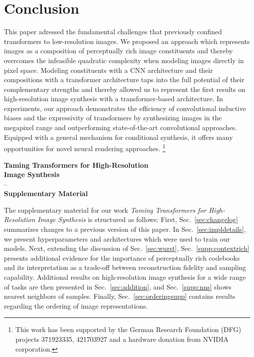 \documentclass[final]{cvpr}
\newcommand{\blfootnote}[1]{%
  \begingroup
  \renewcommand\thefootnote{}\footnote{#1}%
  \addtocounter{footnote}{-1}%
  \endgroup
  }
\begin{document}
%
\section{Conclusion}
%
%
\noindent This paper adressed the fundamental challenges that previously confined transformers to
low-resolution images. We
proposed an approach which represents images as a composition of perceptually
rich image constituents and thereby overcomes the infeasible quadratic
complexity when modeling images directly in pixel space. Modeling constituents
with a CNN architecture and their compositions with a transformer architecture
taps into the full potential of their complementary strengths and thereby
allowed us to represent the first results on high-resolution image synthesis
with a transformer-based architecture. In experiments, our approach
demonstrates the efficiency of convolutional inductive biases and the
expressivity of transformers by synthesizing images in the megapixel range and
outperforming state-of-the-art convolutional approaches. Equipped with a
general mechanism for conditional synthesis, it offers many
opportunities for novel neural rendering approaches.
%
\blfootnote{\noindent This work has been supported by the German Research Foundation
(DFG) projects 371923335, 421703927 and a hardware donation from NVIDIA
corporation.}


\newpage
\clearpage
%
%
%
%
\appendix
\onecolumn

\begin{center}
  \textbf{
    \Large Taming Transformers for High-Resolution \\\vspace{0.3em} Image Synthesis} \\
  \Large 
-- \\
 \textbf{\large Supplementary Material} \\
\hspace{1cm}
\end{center}

\FloatBarrier

%
\noindent
The supplementary material for our work \emph{Taming Transformers for High-Resolution Image Synthesis} is structured as follows:
First, Sec.~\ref{sec:changelog} summarizes changes to a previous version of this
paper. In Sec.~\ref{sec:impldetails}, we present hyperparameters and
architectures which were used to train our models. Next, extending the
discussion of Sec.~\ref{sec:wurst}, Sec.~\ref{supp:contextrich} presents
additional evidence for the importance of perceptually rich codebooks and its
interpretation as a trade-off between reconstruction fidelity and sampling capability.
Additional results on high-resolution image synthesis for a wide range of tasks
are then presented in Sec.~\ref{sec:addition}, and Sec.~\ref{supp:nns} shows
nearest neighbors of samples. Finally, Sec.~\ref{sec:orderingsupp}
contains results regarding the ordering of image representations.
%
\end{document}
